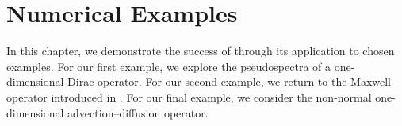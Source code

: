 


\chapter{Numerical Examples}

In this chapter, we demonstrate the success of  through its application to chosen examples. For our first example, we explore the pseudospectra of a one-dimensional Dirac operator. For our second example, we return to the Maxwell operator
introduced in . For our final example, we consider the non-normal one-dimensional advection--diffusion operator. 


